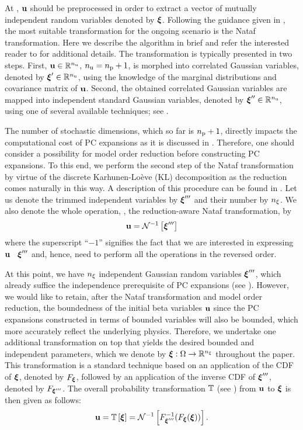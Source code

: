 At , $\mathbf{u}$ should be preprocessed in order to extract a vector of mutually independent random variables denoted by $\boldsymbol{\xi}$.
Following the guidance given in , the most suitable transformation for the ongoing scenario is the Nataf transformation.
Here we describe the algorithm in brief and refer the interested reader to \cite{li2008} for additional details.
The transformation is typically presented in two steps.
First, $\mathbf{u} \in \mathbb{R}^{n_\text{u}}$, ${n_\text{u}} = {n_\text{p}} + 1$, is morphed into correlated Gaussian variables, denoted by $\boldsymbol{\xi}' \in \mathbb{R}^{n_\text{u}}$, using the knowledge of the marginal distributions and covariance matrix of $\mathbf{u}$.
Second, the obtained correlated Gaussian variables are mapped into independent standard Gaussian variables, denoted by $\boldsymbol{\xi}'' \in \mathbb{R}^{n_\text{u}}$, using one of several available techniques; see \cite{li2008}.

The number of stochastic dimensions, which so far is ${n_\text{p}} + 1$, directly impacts the computational cost of PC expansions as it is discussed in .
Therefore, one should consider a possibility for model order reduction before constructing PC expansions.
To this end, we perform the second step of the Nataf transformation by virtue of the discrete Karhunen-Lo\`{e}ve (KL) decomposition \cite{ghanem1991} as the reduction comes naturally in this way.
A description of this procedure can be found in .
Let us denote the trimmed independent variables by $\boldsymbol{\xi}'''$ and their number by ${n_\xi}$.
We also denote the whole operation, \ie, the reduction-aware Nataf transformation, by
\[
  \mathbf{u} = \mathcal{N}^{-1}\left[\boldsymbol{\xi}'''\right]
\]
where the superscript ``$-1$'' signifies the fact that we are interested in expressing $\mathbf{u}$ \via\ $\boldsymbol{\xi}'''$ and, hence, need to perform all the operations in the reversed order.

At this point, we have ${n_\xi}$ independent Gaussian random variables $\boldsymbol{\xi}'''$, which already suffice the independence prerequisite of PC expansions (see ).
However, we would like to retain, after the Nataf transformation and model order reduction, the boundedness of the initial beta variables $\mathbf{u}$ since the PC expansions constructed in terms of bounded variables will also be bounded, which more accurately reflect the underlying physics.
Therefore, we undertake one additional transformation on top that yields the desired bounded and independent parameters, which we denote by $\boldsymbol{\xi}: \Omega \to \mathbb{R}^{n_\xi}$ throughout the paper.
This transformation is a standard technique based on an application of the CDF of $\boldsymbol{\xi}$, denoted by $F_{\boldsymbol{\xi}}$, followed by an application of the inverse CDF of $\boldsymbol{\xi}'''$, denoted by $F_{\boldsymbol{\xi}'''}$.
The overall probability transformation $\oTransform$ (see ) from $\mathbf{u}$ to $\boldsymbol{\xi}$ is then given as follows:
\[
  \vU = \oTransform{\vZ} = \oInvNataf{\fCDF^{-1}_{\vZ'''}(\fCDF_{\vZ}(\vZ))}.
\]
